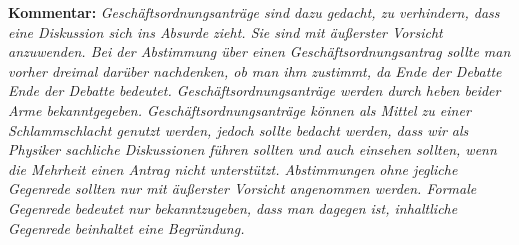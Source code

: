 \textbf{Kommentar:} \textit{\footnotesize Geschäftsordnungsanträge
sind dazu gedacht, zu verhindern, dass eine Diskussion sich ins
Absurde zieht. Sie sind mit äußerster Vorsicht anzuwenden. Bei der
Abstimmung über einen Geschäftsordnungsantrag sollte man vorher
dreimal darüber nachdenken, ob man ihm zustimmt, da Ende der Debatte
Ende der Debatte bedeutet. Geschäftsordnungsanträge werden durch
heben beider Arme bekanntgegeben. Geschäftsordnungsanträge können
als Mittel zu einer Schlammschlacht genutzt werden, jedoch sollte
bedacht werden, dass wir als Physiker sachliche Diskussionen führen
sollten und auch einsehen sollten, wenn die Mehrheit einen Antrag
nicht unterstützt. Abstimmungen ohne jegliche Gegenrede sollten nur
mit äußerster Vorsicht angenommen werden. Formale Gegenrede bedeutet
nur bekanntzugeben, dass man dagegen ist,
inhaltliche Gegenrede beinhaltet eine Begründung.}

